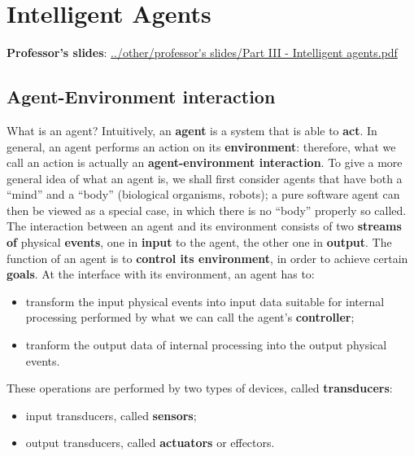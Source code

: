 \section{Intelligent Agents}
\textbf{Professor's slides}:\newline
\url{../other/professor's slides/Part III - Intelligent agents.pdf}
\subsection{Agent-Environment interaction}
What is an agent? Intuitively, an \textbf{agent} is a system that is able to \textbf{act}.\newline
\newline
In general, an agent performs an action on its \textbf{environment}: therefore, what we call
an action is actually an \textbf{agent-environment interaction}. To give a more general idea of what an agent is, we shall first consider agents that have
both a “mind” and a “body” (biological organisms, robots); a pure software agent can then
be viewed as a special case, in which there is no “body” properly so called.\newline
\newline
The interaction between an agent and its environment consists of two \textbf{streams of} physical
\textbf{events}, one in \textbf{input} to the agent, the other one in \textbf{output}.\newline
\newline
The function of an agent is to \textbf{control its environment}, in order to achieve certain \textbf{goals}.\newline
\newline
At the interface with its environment, an agent has to:
\begin{itemize}
    \item transform the input physical events into input data suitable for internal processing performed by what we can call the agent’s \textbf{controller};
    \item tranform the output data of internal processing into the output physical events.
\end{itemize}
These operations are performed by two types of devices, called \textbf{transducers}:
\begin{itemize}
    \item input transducers, called \textbf{sensors};
    \item output transducers, called \textbf{actuators} or effectors.
\end{itemize}
